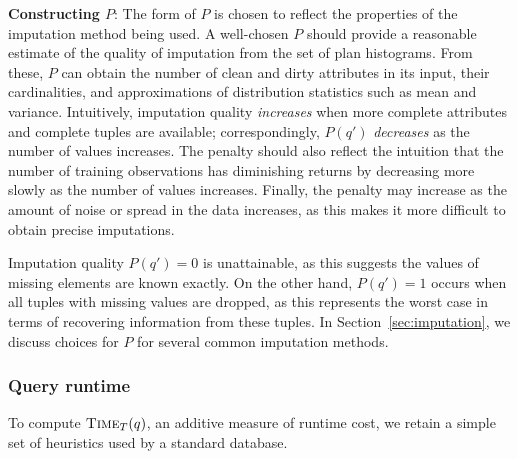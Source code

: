 {\textbf{Constructing $P$}:
The form of $P$ is chosen to reflect the properties of the imputation method being used.
A well-chosen $P$ should provide a reasonable estimate of the quality of imputation from the set of plan histograms.
From these, $P$ can obtain the number of clean and dirty attributes in its input, their cardinalities, and approximations of distribution statistics such as mean and variance.
Intuitively, imputation quality \textit{increases} when more complete attributes and complete tuples are available; correspondingly, $P(q')$ \textit{decreases} as the number of values increases.
The penalty should also reflect the intuition that the number of training observations has diminishing returns by decreasing more slowly as the number of values increases.
Finally, the penalty may increase as the amount of noise or spread in the data increases, as this makes it more difficult to obtain precise imputations.

Imputation quality $P(q')=0$ is unattainable, as this suggests the values of missing elements are known exactly.
On the other hand, $P(q')=1$ occurs when all tuples with missing values are dropped, as this represents the worst case in terms of recovering information from these tuples.
In Section~\ref{sec:imputation}, we discuss choices for $P$ for several common imputation methods.

\subsubsection{Query runtime}
\label{sec:query-runtime}

To compute $\textsc{Time}_{T}(q)$, an additive measure of runtime cost, we retain a simple set of heuristics used by a standard database.


}
